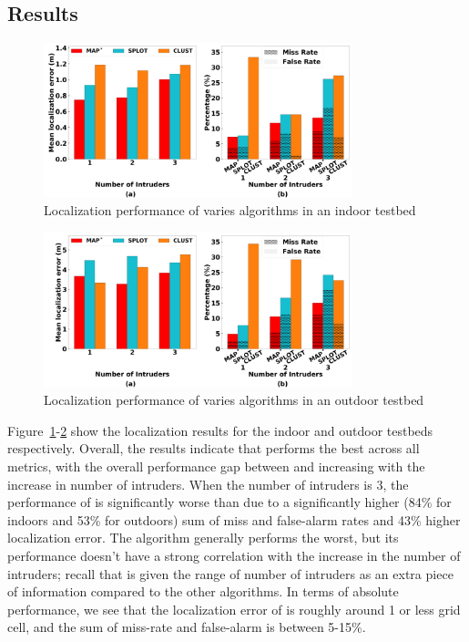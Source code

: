 \subsection{Results}

\begin{figure}[ht]
	\centering
	\includegraphics[width=0.8\textwidth]{chapters/ipsn/figures/indoor-error-missfalse.png}
	\caption{Localization performance of varies algorithms in an indoor testbed}
	\label{fig:indoor-error-miss-false}
\end{figure}

\begin{figure}[ht]
	\centering
	\includegraphics[width=0.8\textwidth]{chapters/ipsn/figures/outdoor-error-missfalse.png}
	\caption{Localization performance of varies algorithms in an outdoor testbed}
	\label{fig:outdoor-error-miss-false}
\end{figure}

Figure~\ref{fig:indoor-error-miss-false}-\ref{fig:outdoor-error-miss-false}
show the localization results for the indoor and outdoor testbeds
respectively. Overall, the results indicate that \ouralgo performs the
best across all metrics, with the overall performance gap between
\ouralgo and \splot increasing with the increase in number of
intruders. When the number of intruders is 3, the performance of
\splot is significantly worse than \ouralgo due to a
significantly higher (84\% for indoors and 53\% for outdoors) sum of miss and false-alarm rates and 43\% higher localization error.
The \cl algorithm generally performs the worst, but its
performance doesn't have a strong correlation with the increase in the
number of intruders; recall that \cl is given the range of number of
intruders as an extra piece of information compared to the other
algorithms.  In terms of absolute performance, we see that the
localization error of \ouralgo is roughly around 1 or less grid cell,
and the sum of miss-rate and false-alarm is between 5-15\%.

